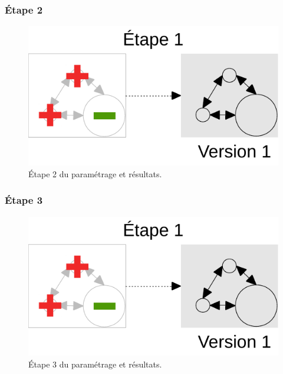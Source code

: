 \documentclass[12pt, a4paper, oneside]{book}
\begin{document}
	\subsubsection{Étape 2}
		\begin{figure}[H]
				\centering
				\includegraphics[width = \linewidth, page = 2]{img/schemas_etapes_individuelles.pdf}
				\caption{Étape 2 du paramétrage et résultats.}
		\end{figure}

\pagebreak
	\subsubsection{Étape 3}
		\begin{figure}[H]
			\centering
			\includegraphics[width = \linewidth, page = 3]{img/schemas_etapes_individuelles.pdf}
			\caption{Étape 3 du paramétrage et résultats.}
		\end{figure}

\pagebreak
\end{document}
